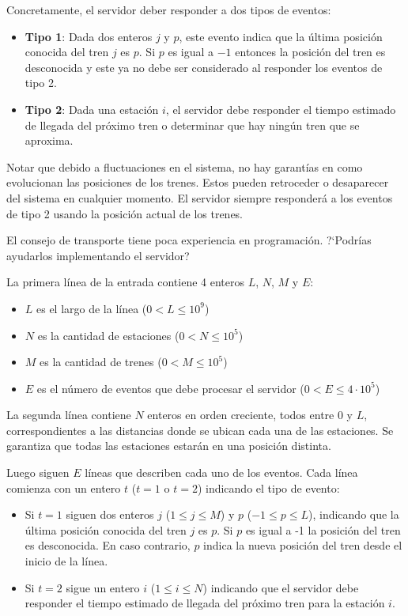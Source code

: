 \documentclass{oci}
\begin{document}
\begin{problemDescription}
  Concretamente, el servidor deber responder a dos tipos
  de eventos:
  \begin{itemize}
    \item \textbf{Tipo 1}: Dada dos enteros $j$ y $p$, este evento
    indica que la última posición conocida del tren $j$ es $p$.
    Si $p$ es igual a $-1$ entonces la posición del tren es desconocida
    y este ya no debe ser considerado al responder los eventos de tipo 2.
    \item \textbf{Tipo 2}: Dada una estación $i$, el servidor debe
    responder el tiempo estimado de llegada del próximo tren o determinar
    que hay ningún tren que se aproxima.
  \end{itemize}

  Notar que debido a fluctuaciones en el sistema, no hay garantías
  en como evolucionan las posiciones de los trenes.
  Estos pueden retroceder o desaparecer del sistema en cualquier momento.
  El servidor siempre responderá a los eventos de tipo 2 usando
  la posición actual de los trenes.

  El consejo de transporte tiene poca experiencia en programación.
  ?`Podrías ayudarlos implementando el servidor?
\end{problemDescription}

\begin{inputDescription}
  La primera línea de la entrada contiene 4 enteros $L$, $N$, $M$ y $E$:
  \begin{itemize}
    \item $L$ es el largo de la línea ($0 < L \leq 10^9$)
    \item $N$ es la cantidad de estaciones ($0 < N \leq 10^5$)
    \item $M$ es la cantidad de trenes ($0 < M \leq 10^5$)
    \item $E$ es el número de eventos que debe procesar el servidor ($0 < E \leq 4\cdot 10^5$)
  \end{itemize}
  La segunda línea contiene $N$ enteros en orden creciente, todos entre 0 y $L$,
  correspondientes a las distancias donde se ubican cada una de las estaciones.
  Se garantiza que todas las estaciones estarán en una posición distinta.

  Luego siguen $E$ líneas que describen cada uno de los eventos.
  Cada línea comienza con un entero $t$ ($t=1$ o $t=2$) indicando el tipo de evento:
  \begin{itemize}
  \item Si $t=1$ siguen dos enteros $j$ ($1\leq j \leq M$) y $p$ ($-1\leq p \leq L$),
  indicando que la última posición conocida del tren $j$ es $p$.
  Si $p$ es igual a -1 la posición del tren es desconocida.
  En caso contrario, $p$ indica la nueva posición del tren desde el inicio
  de la línea.
  \item Si $t=2$ sigue un entero $i$ ($1\leq i \leq N$)
  indicando que el servidor debe responder el tiempo
  estimado de llegada del próximo tren para la estación $i$.
  \end{itemize}

\end{inputDescription}
\end{document}

